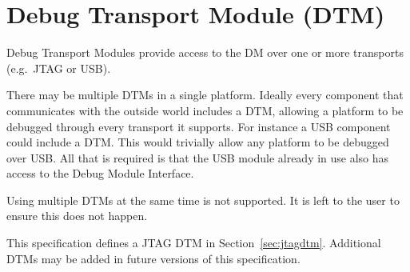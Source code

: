 \chapter{Debug Transport Module (DTM)} \label{dtm}

Debug Transport Modules provide access to the DM over one or more transports
(e.g.\ JTAG or USB).

There may be multiple DTMs in a single platform. Ideally every component that
communicates with the outside world includes a DTM, allowing a platform to be
debugged through every transport it supports.  For instance a USB component
could include a DTM. This would trivially allow any platform to be debugged
over USB. All that is required is that the USB module already in use also has
access to the Debug Module Interface.

Using multiple DTMs at the same time is not supported. It is left to the user
to ensure this does not happen.

This specification defines a JTAG DTM in Section~\ref{sec:jtagdtm}. Additional DTMs
may be added in future versions of this specification.


